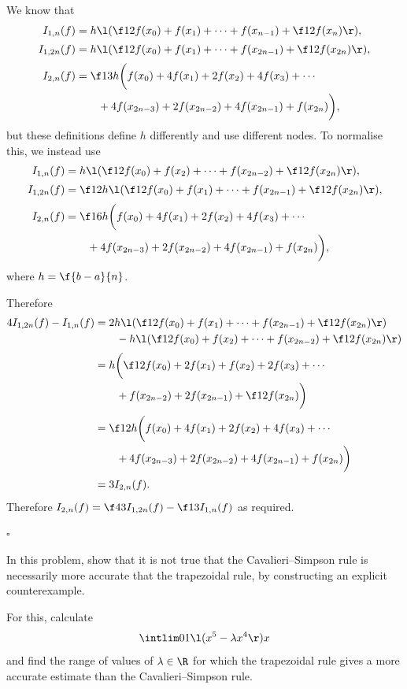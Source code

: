 \documentclass[a4paper]{article}
\begin{document}
We know that
\begin{align*}
I_{1, n}(f) &= h \l( \f12 f(x_0) + f(x_1) + \dotsb + f(x_{n - 1}) + \f12 f(x_n) \r), \\[0.5ex]
I_{1, 2n}(f) &= h \l( \f12 f(x_0) + f(x_1) + \dotsb + f(x_{2n - 1}) + \f12 f(x_{2n}) \r), \\[0.5ex]
I_{2, n}(f) &= \f13 h \bigg( f(x_0) + 4 f(x_1) + 2 f(x_2) + 4 f(x_3) + \cdots \\
    &\qquad + 4 f(x_{2n - 3}) + 2 f(x_{2n - 2}) + 4 f(x_{2n - 1}) + f(x_{2n}) \bigg),
\end{align*}
but these definitions define $h$ differently and use different nodes. To normalise this, we instead use
\begin{align*}
I_{1, n}(f) &= h \l( \f12 f(x_0) + f(x_2) + \dotsb + f(x_{2n - 2}) + \f12 f(x_{2n}) \r), \\[0.5ex]
I_{1, 2n}(f) &= \f12 h \l( \f12 f(x_0) + f(x_1) + \dotsb + f(x_{2n - 1}) + \f12 f(x_{2n}) \r), \\[0.5ex]
I_{2, n}(f) &= \f16 h \bigg( f(x_0) + 4 f(x_1) + 2 f(x_2) + 4 f(x_3) + \cdots \\
    &\qquad + 4 f(x_{2n - 3}) + 2 f(x_{2n - 2}) + 4 f(x_{2n - 1}) + f(x_{2n}) \bigg),
\end{align*}
where $h = \f{b-a}{n}$.

Therefore
\begin{align*}
4 I_{1, 2n}(f) - I_{1, n}(f) &=
    2 h \l( \f12 f(x_0) + f(x_1) + \dotsb + f(x_{2n - 1}) + \f12 f(x_{2n}) \r) \\
    &\qquad - h \l( \f12 f(x_0) + f(x_2) + \dotsb + f(x_{2n - 2}) + \f12 f(x_{2n}) \r) \\[0.5ex]
&= h \bigg( \f12 f(x_0) + 2 f(x_1) + f(x_2) + 2 f(x_3) + \dotsb \\
    &\qquad + f(x_{2n - 2}) + 2 f(x_{2n - 1}) + \f12 f(x_{2n}) \bigg) \\[0.5ex]
&= \f12 h \bigg( f(x_0) + 4 f(x_1) + 2 f(x_2) + 4 f(x_3) + \cdots \\
    &\qquad + 4 f(x_{2n - 3}) + 2 f(x_{2n - 2}) + 4 f(x_{2n - 1}) + f(x_{2n}) \bigg) \\[0.5ex]
&= 3 I_{2, n}(f).
\end{align*}
Therefore $I_{2, n}(f) = \f43 I_{1, 2n}(f) - \f13 I_{1, n}(f)$ as required.

\hfill $\square$



\begin{questionbody}
In this problem, show that it is not true that the Cavalieri--Simpson rule is necessarily more accurate that the trapezoidal rule, by constructing an explicit counterexample. %

For this, calculate \[
\intlim 01 {\l( x^5 - \lambda x^4 \r)} x
\] and find the range of values of $\lambda \in \R$ for which the trapezoidal rule gives a more accurate estimate than the Cavalieri--Simpson rule. %
\end{questionbody}
\end{document}

